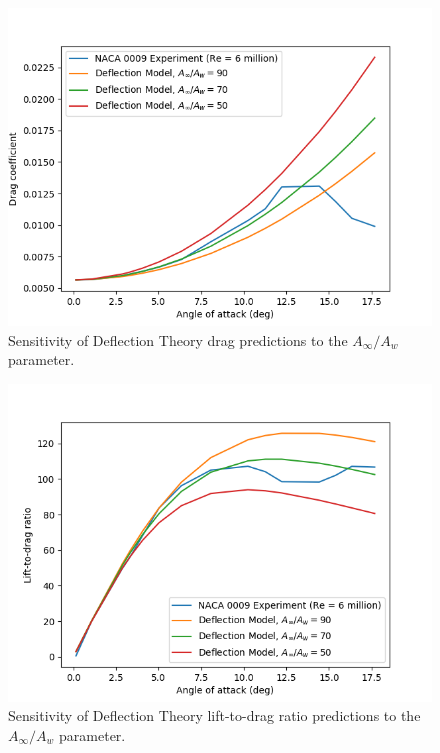 \begin{figure}[htb]
\includegraphics[totalheight=4.5cm]{cd_ratio}
\caption{Sensitivity of Deflection Theory drag predictions to the \(A_\infty / A_w\) parameter.}
\label{fig:cd_ratio}
\end{figure}

\begin{figure}[htb]
\includegraphics[totalheight=4.5cm]{ld_ratio}
\caption{Sensitivity of Deflection Theory lift-to-drag ratio predictions to the \(A_\infty / A_w\) parameter.}
\label{fig:ld_ratio}
\end{figure}

